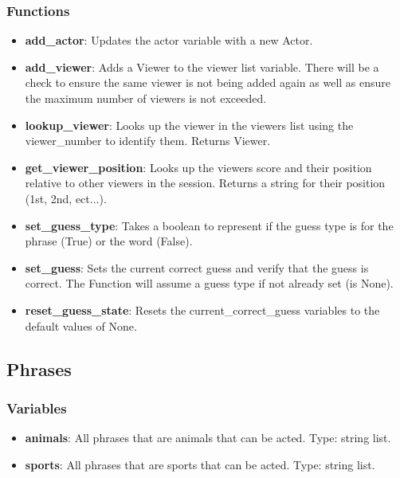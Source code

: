 \documentclass{article}
\begin{document}
\subsubsection{Functions}
\begin{itemize}

	\item \textbf{add\_actor}: Updates the actor variable with a new Actor.
	
	\item \textbf{add\_viewer}: Adds a Viewer to the viewer list variable. There will be a check to ensure the same viewer is not being added again as well as ensure the maximum number of viewers is not exceeded.
	
	\item \textbf{lookup\_viewer}: Looks up the viewer in the viewers list using the viewer\_number to identify them. Returns Viewer.
	
	\item \textbf{get\_viewer\_position}: Looks up the viewers score and their position relative to other viewers in the session. Returns a string for their position (1st, 2nd, ect...).
	
	\item \textbf{set\_guess\_type}: Takes a boolean to represent if the guess type is for the phrase (True) or the word (False).
	
	\item \textbf{set\_guess}: Sets the current correct guess and verify that the guess is correct. The Function will assume a guess type if not already set (is None).
	
	\item \textbf{reset\_guess\_state}: Resets the current\_correct\_guess variables to the default values of None.
	
\end{itemize}

\subsection{Phrases}
\subsubsection{Variables}
\begin{itemize}

	\item \textbf{animals}: All phrases that are animals that can be acted. Type: string list.
	
	\item \textbf{sports}: All phrases that are sports that can be acted. Type: string list.
	
\end{itemize}
\end{document}
